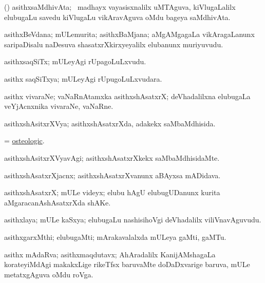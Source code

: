 \bentry
{}
\gl{\nA}
\bmng
(\veYshA) asithxsaMdhivAta; \sA\ madhayx vayasisxnalilx uMTAguva, kiVlugaLalilx elubugaLu savedu kiVlugaLu vikAravAguva oMdu bageya saMdhivAta. 
\emng
\eentry

\bentry
{}
\gl{\nA}
\bmng
asithxBeVdana; mULemurita; asithxBaMjana; aMgAMgagaLa vikAragaLanunx saripaDisalu naDesuva shasatxrXkirxyeyalilx elubanunx muriyuvudu. 
\emng
\eentry

\bentry
{}
\gl{\nA}
\bmng
asithxsaqSiTx; mULeyAgi rUpagoLuLxvudu. 
\emng
\eentry

\bentry
{}
\gl{\gu}
\bmng
asithx saqSiTxya; mULeyAgi rUpugoLuLxvudara. 
\emng
\eentry

\bentry
{}
\gl{\nA}
\bmng
asithx vivaraNe; vaNaRnAtamxka asithxshAsatxrX; deVhadalilxna elubugaLa veYjAcnxnika vivaraNe, vaNaRne. 
\emng
\eentry

\bentry
{}
\gl{\gu}
\bmng
asithxshAsitxrXVya; asithxshAsatxrXda, adakekx saMbaMdhisida. 
\emng
\eentry

\bentry
{}
\gl{\gu}
\bmng
= \hyperlink{osteologic}{osteologic}. 
\emng
\eentry

\bentry
{}
\gl{\kirxvi}
\bmng
asithxshAsitxrXVyavAgi; asithxshAsatxrXkekx saMbaMdhisidaMte. 
\emng
\eentry

\bentry
{}
\gl{\nA}
\bmng
asithxshAsatxrXjacnx; asithxshAsatxrXvanunx aBAyxsa mADidava. 
\emng
\eentry

\bentry
{}
\gl{\nA}
\bmng
asithxshAsatxrX; mULe videyx; elubu hAgU elubugUDanunx kurita aMgaracanAshAsatxrXda shAKe. 
\emng
\eentry

\bentry
{}
\gl{\nA}
\bmng
asithxlaya; mULe kaSxya; elubugaLu nashisihoVgi deVhadalilx viliVnavAguvudu. 
\emng
\eentry

\bentry
{}
\gl{\nA}
\bmng
asithxgarxMthi; elubugaMti; mArakavalalxda mULeya gaMti, gaMTu. 
\emng
\eentry

\bentry
{}
\gl{\nA}
\bmng
asithx mAdaRva; asithxmaqdutavx; AhAradalilx KanijAMshagaLa korateyiMdAgi makakxLige rikeTfsx baruvaMte doDaDxvarige baruva, mULe metatxgAguva oMdu roVga. 
\emng
\eentry

